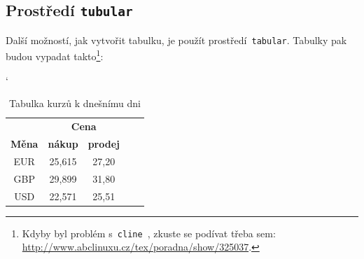 \documentclass[a4paper, 11pt]{article}
\begin{document}
\subsection{Prostředí \texttt{tubular}}
Další možností, jak vytvořit tabulku, je použít prostředí\texttt{ tabular}. Tabulky pak
budou vypadat takto\footnote{Kdyby byl problém s\texttt{ cline }, zkuste se podívat třeba sem: \hyperlink{http://www.abclinuxu.cz/tex/poradna/show/325037}{http://www.abclinuxu.cz/tex/poradna/show/325037}.}: \\
\begin{table}[h]
\begin{center}
\catcode`
 \begin{tabular}{|c|c|c|c|c|}
 \hline
 & \multicolumn{2}{c|}{\textbf{Cena}} \\\cline{2-3}
\textbf{Měna} & \textbf{nákup} & \textbf{prodej} \\
 \hline
EUR & 25,615 & 27,20 \\
GBP & 29,899 & 31,80 \\
USD & 22,571 & 25,51 \\
\hline
 \end{tabular}
\caption{Tabulka kurzů k dnešnímu dni}
\label{tab1}
\end{center}
\end{table}
\end{document}
